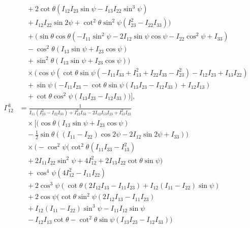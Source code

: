 \documentclass[lineno, pdflatex,sn-mathphys-ay]{sn-jnl}
\theoremstyle{thmstyleone}%
\theoremstyle{thmstyletwo}%
\theoremstyle{thmstylethree}%
\begin{document}
\begin{appendices}
\begin{align}
    &\quad +2 \cot \theta \left(I_{12} I_{23} \sin \psi-I_{13} I_{22} \sin ^3\psi\right) \nonumber \\
    &\quad +I_{12} I_{22} \sin 2\psi+\cot ^2\theta \sin ^2\psi \left(I_{23}^2-I_{22} I_{33}\right)\bigg) \nonumber \\
    &\quad +\bigg(\sin \theta \cos \theta \left(-I_{11} \sin ^2\psi-2 I_{12} \sin \psi \cos \psi-I_{22} \cos ^2\psi+I_{33}\right) \nonumber \\
    &\quad -\cos ^2\theta (I_{13} \sin \psi+I_{23} \cos \psi) \nonumber \\
    &\quad +\sin ^2\theta (I_{13} \sin \psi+I_{23} \cos \psi)\bigg) \nonumber \\
    &\quad \times \bigg(\cos \psi \left(\cot \theta \sin \psi \left(-I_{11} I_{33}+I_{13}^2+I_{22} I_{33}-I_{23}^2\right)-I_{12} I_{23}+I_{13} I_{22}\right) \nonumber \\
    &\quad +\sin \psi (-I_{11} I_{23}-\cot \theta \sin \psi (I_{13} I_{23}-I_{12} I_{33})+I_{12} I_{13}) \nonumber \\
    &\quad +\cot \theta \cos ^2\psi (I_{13} I_{23}-I_{12} I_{33})\bigg) \bigg], \nonumber \\
    \Gamma^{3}_{12} &= \frac{1}{I_{11} \left(I_{23}^2-I_{22} I_{33}\right)+I_{12}^2 I_{33}-2 I_{12} I_{13} I_{23}+I_{13}^2 I_{22}} \nonumber \\
    &\quad \times \bigg[ \bigg(\cos \theta (I_{13} \sin \psi+I_{23} \cos \psi) \nonumber \\
    &\quad -\frac{1}{2} \sin \theta ((I_{11}-I_{22}) \cos 2\psi-2 I_{12} \sin 2\psi+I_{33})\bigg) \nonumber \\
    &\quad \times \bigg(-\cos ^2\psi \Big(\cot ^2\theta \left(I_{11} I_{33}-I_{13}^2\right) \nonumber \\
    &\quad +2 I_{11} I_{22} \sin ^2\psi+4 I_{12}^2+2 I_{13} I_{22} \cot \theta \sin \psi\Big) \nonumber \\
    &\quad +\cos ^4\psi \left(4 I_{12}^2-I_{11} I_{22}\right) \nonumber \\
    &\quad +2 \cos ^3\psi (\cot \theta (2 I_{12} I_{13}-I_{11} I_{23})+I_{12} (I_{11}-I_{22}) \sin \psi) \nonumber \\
    &\quad +2 \cos \psi \Big(\cot \theta \sin ^2\psi (2 I_{12} I_{13}-I_{11} I_{23}) \nonumber \\
    &\quad +I_{12} (I_{11}-I_{22}) \sin ^3\psi -I_{11} I_{12} \sin \psi \nonumber \\
    &\quad -I_{12} I_{13} \cot \theta-\cot ^2\theta \sin \psi (I_{13} I_{23}-I_{12} I_{33})\Big) \nonumber \\

\end{align}
\end{appendices}
\end{document}
